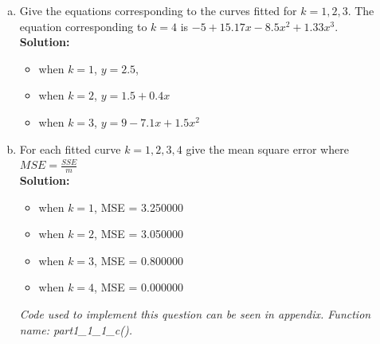 \documentclass[A4,12pt]{article}
\begin{document}
\begin{enumerate}[1.]
\begin{enumerate}[(a)]
\begin{figure}
{                Curves corresponding to fit from dimension 1 to 4
              }
            \end{figure}
            \item Give the equations corresponding to the curves fitted for $k = 1, 2, 3$. The equation corresponding to $ k = 4 $ is $-5 + 15.17x - 8.5x^2 + 1.33x^3$.\\
            \textbf{Solution:} 
              \begin{itemize}
                \item when $k = 1$, $y = 2.5$,
                \item when $k = 2$, $y = 1.5 + 0.4x$
                \item when $k = 3$, $y = 9-7.1x+1.5x^2$
              \end{itemize}
            
            \item For each fitted curve $k = 1, 2, 3, 4$ give the mean square error where $MSE = \frac{SSE}{m}$\\
            \textbf{Solution:}
              \begin{itemize}
                \item when $k = 1$, MSE = 3.250000
                \item when $k = 2$, MSE = 3.050000
                \item when $k = 3$, MSE = 0.800000
                \item when $k = 4$, MSE = 0.000000
              \end{itemize}
              \textit{Code used to implement this question can be seen in appendix. Function name: part1\_1\_1\_c().}
        \end{enumerate}


\end{enumerate}
\end{document}
